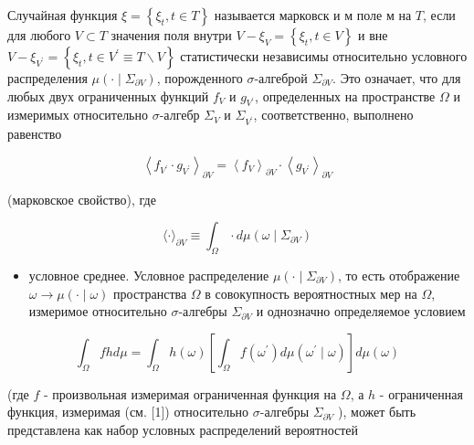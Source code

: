 \documentclass[10pt]{article}
\begin{document}
Случайная функция $\xi=\left\{\xi_{t}, t \in T\right\}$ называется марковск и м поле м на $T$, если для любого $V \subset T$ значения поля внутри $V-\xi_{V}=\left\{\xi_{t}, t \in V\right\}$ и вне $V-\xi_{V^{\prime}}=\left\{\xi_{t}, t \in V^{\prime} \equiv T \backslash V\right\}$ статистически независимы относительно условного распределения $\mu\left(\cdot \mid \Sigma_{\partial V}\right)$, порожденного $\sigma$-алгеброй $\Sigma_{\partial V}$. Это означает, что для любых двух ограниченных функций $f_{V}$ и $g_{V^{\prime}}$, определенных на пространстве $\Omega$ и измеримых относительно $\sigma$-алгебр $\Sigma_{V}$ и $\Sigma_{V^{\prime}}$, соответственно, выполнено равенство



\[

\left\langle f_{V^{\prime}} \cdot g_{V^{\prime}}\right\rangle_{\partial V}=\left\langle f_{V}\right\rangle_{\partial V} \cdot\left\langle g_{V^{\prime}}\right\rangle_{\partial V}

\]



(марковское свойство), где



\[

\langle\cdot\rangle_{\partial V} \equiv \int_{\Omega} \cdot d \mu\left(\omega \mid \Sigma_{\partial V}\right)

\]



\begin{itemize}

  \item условное среднее. Условное распределение $\mu\left(\cdot \mid \Sigma_{\partial V}\right)$, то есть отображение $\omega \rightarrow \mu(\cdot \mid \omega)$ пространства $\Omega$ в совокупность вероятностных мер на $\Omega$, измеримое относительно $\sigma$-алгебры $\Sigma_{\partial V}$ и однозначно определяемое условием

\end{itemize}



\[

\int_{\Omega} f h d \mu=\int_{\Omega} h(\omega)\left[\int_{\Omega} f\left(\omega^{\prime}\right) d \mu\left(\omega^{\prime} \mid \omega\right)\right] d \mu(\omega)

\]



(где $f$ - произвольная измеримая ограниченная функция на $\Omega$, а $h$ - ограниченная функция, измеримая (см. [1]) относительно $\sigma$-алгебры $\Sigma_{\partial V}$ ), может быть представлена как набор условных распределений вероятностей
\end{document}
